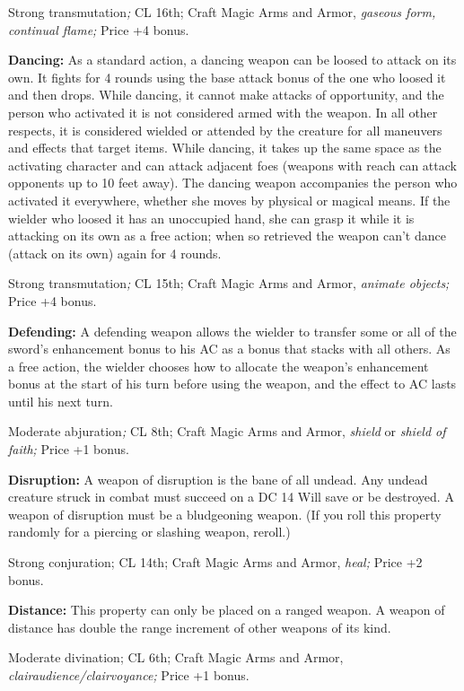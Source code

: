 Strong transmutation\textit{; }CL 16th; Craft Magic Arms and Armor, \textit{gaseous 
form, continual flame; }Price +4 bonus.

\textbf{Dancing: }As a standard action, a dancing weapon can be loosed to attack 
on its own. It fights for 4 rounds using the base attack bonus of the one who loosed 
it and then drops. While dancing, it cannot make attacks of opportunity, and the 
person who activated it is not considered armed with the weapon. In all other respects, 
it is considered wielded or attended by the creature for all maneuvers and effects 
that target items. While dancing, it takes up the same space as the activating 
character and can attack adjacent foes (weapons with reach can attack opponents 
up to 10 feet away). The dancing weapon accompanies the person who activated it 
everywhere, whether she moves by physical or magical means. If the wielder who 
loosed it has an unoccupied hand, she can grasp it while it is attacking on its 
own as a free action; when so retrieved the weapon can't dance (attack on its own) 
again for 4 rounds.

Strong transmutation\textit{; }CL 15th; Craft Magic Arms and Armor, \textit{animate 
objects; }Price +4 bonus.

\textbf{Defending:} A defending weapon allows the wielder to transfer some or all 
of the sword's enhancement bonus to his AC as a bonus that stacks with all others. 
As a free action, the wielder chooses how to allocate the weapon's enhancement 
bonus at the start of his turn before using the weapon, and the effect to AC lasts 
until his next turn.

Moderate abjuration\textit{; }CL 8th; Craft Magic Arms and Armor, \textit{shield 
}or \textit{shield of faith; }Price +1 bonus.

\textbf{Disruption:} A weapon of disruption is the bane of all undead. Any undead 
creature struck in combat must succeed on a DC 14 Will save or be destroyed. A 
weapon of disruption must be a bludgeoning weapon. (If you roll this property randomly 
for a piercing or slashing weapon, reroll.)

Strong conjuration; CL 14th; Craft Magic Arms and Armor, \textit{heal; }Price +2 
bonus.

\textbf{Distance: }This property can only be placed on a ranged weapon. A weapon 
of distance has double the range increment of other weapons of its kind.

Moderate divination; CL 6th; Craft Magic Arms and Armor, \textit{clairaudience/clairvoyance; 
}Price +1 bonus.

